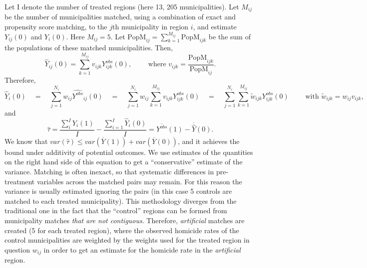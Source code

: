 \documentclass{article}[11 pt]
\begin{document}
Let I denote the number of treated regions (here 13, 205 municipalities). Let $M_{ij}$ be the number of municipalities matched, using a combination of exact and propensity score matching, to the $j$th municipality in region $i$, and estimate $Y_{ij}(0)$ and $Y_i(0)$. Here $M_{ij}=5$.
      Let $\textrm{PopM}_{ij}=\sum_{k=1}^{M_{ij}}\textrm{PopM}_{ijk}$ be the sum of the populations of these matched municipalities. Then,
      $$\hat{Y}_{ij}(0) =\sum_{k=1}^{M_{ij}}v_{ijk}Y^{obs}_{ijk}(0),\quad \quad \textrm{ where } v_{ijk}=\frac{\textrm{PopM}_{ijk}}{\textrm{PopM}_{ij}}.$$
      Therefore,
      $$\hat{Y}_{i}(0) \quad =\quad \sum_{j=1}^{N_i}w_{ij}\hat{Y^{obs}}_{ij}(0)\quad =\quad\sum_{j=1}^{N_i}w_{ij}\sum_{k=1}^{M_{ij}}v_{ijk}Y^{obs}_{ijk}(0)\quad =\quad
      \sum_{j=1}^{N_i}\sum_{k=1}^{M_{ij}}\tilde{w}_{ijk}Y^{obs}_{ijk}(0) \quad \quad \textrm{ with } \tilde{w}_{ijk} = w_{ij}v_{ijk}, $$
      and
      $$\hat{\tau}=\frac{\sum_i^{I} Y_i(1)}{I}-\frac{\sum_{i=1}^{I}\hat{Y}_i(0)}{I}=\overline{Y^{obs}}(1)-\overline{\hat{Y}}(0) .$$
      We know that $var(\hat{\tau})\leq var(\overline{Y}(1))+var(\overline{Y}(0))$,%
and it achieves the bound under additivity of potential outcomes. We use estimates of the quantities on the right hand side of this equation to get a ``conservative'' estimate of the variance. Matching is often inexact, so that systematic differences in pre-treatment variables across the matched pairs may remain. For this reason the variance is usually estimated ignoring the pairs (in this case 5 controls are matched to each treated municipality). This methodology diverges from the traditional one in the fact that the ``control'' regions can be formed from municipality matches \emph{that are not contiguous}. Therefore, \emph{artificial} matches are created (5 for each treated region), where the observed homicide rates of the control municipalities are weighted by the weights used for the treated region in question $w_{ij}$ in order to get an estimate for the homicide rate in the \emph{artificial} region. 

\end{document}
